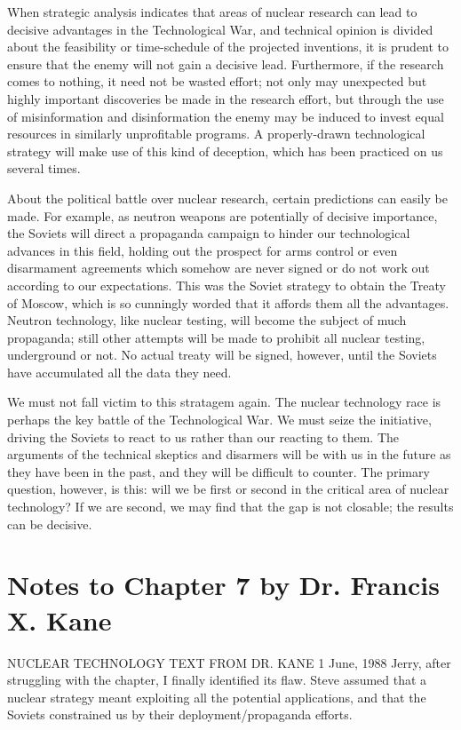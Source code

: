 When strategic analysis indicates that areas of nuclear research can lead to decisive advantages in the Technological War, and technical opinion is divided about the feasibility or time-schedule of the projected inventions, it is prudent to ensure that the enemy will not gain a decisive lead. Furthermore, if the research comes to nothing, it need not be wasted effort; not only may unexpected but highly important discoveries be made in the research effort, but through the use of misinformation and disinformation the enemy may be induced to invest equal resources in similarly unprofitable programs. A properly-drawn technological strategy will make use of this kind of deception, which has been practiced on us several times.

About the political battle over nuclear research, certain predictions can easily be made. For example, as neutron weapons are potentially of decisive importance, the Soviets will direct a propaganda campaign to hinder our technological advances in this field, holding out the prospect for arms control or even disarmament agreements which somehow are never signed or do not work out according to our expectations. This was the Soviet strategy to obtain the Treaty of Moscow, which is so cunningly worded that it affords them all the advantages. Neutron technology, like nuclear testing, will become the subject of much propaganda; still other attempts will be made to prohibit all nuclear testing, underground or not. No actual treaty will be signed, however, until the Soviets have accumulated all the data they need.

We must not fall victim to this stratagem again. The nuclear technology race is perhaps the key battle of the Technological War. We must seize the initiative, driving the Soviets to react to us rather than our reacting to them. The arguments of the technical skeptics and disarmers will be with us in the future as they have been in the past, and they will be difficult to counter. The primary question, however, is this: will we be first or second in the critical area of nuclear technology? If we are second, we may find that the gap is not closable; the results can be decisive.

\section{Notes to Chapter 7 by Dr. Francis X. Kane}
NUCLEAR TECHNOLOGY
TEXT FROM DR. KANE
1 June, 1988
Jerry, after struggling with the chapter, I finally identified its flaw. Steve assumed that a nuclear strategy meant exploiting all the potential applications, and that the Soviets constrained us by their deployment/propaganda efforts.

